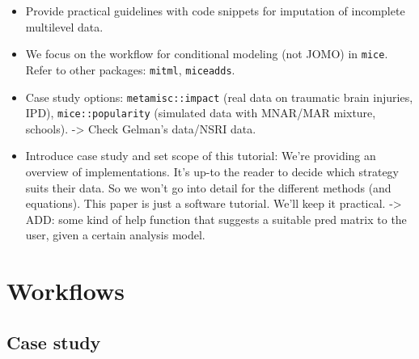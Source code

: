 \documentclass[
]{jss}
\begin{document}
\begin{itemize}
\item
  Provide practical guidelines with code snippets for imputation of
  incomplete multilevel data.
\item
  We focus on the workflow for conditional modeling (not JOMO) in
  \texttt{mice}. Refer to other packages: \texttt{mitml},
  \texttt{miceadds}.
\item
  Case study options: \texttt{metamisc::impact} (real data on traumatic
  brain injuries, IPD), \texttt{mice::popularity} (simulated data with
  MNAR/MAR mixture, schools). -\textgreater{} Check Gelman's data/NSRI
  data.
\item
  Introduce case study and set scope of this tutorial: We're providing
  an overview of implementations. It's up-to the reader to decide which
  strategy suits their data. So we won't go into detail for the
  different methods (and equations). This paper is just a software
  tutorial. We'll keep it practical. -\textgreater{} ADD: some kind of
  help function that suggests a suitable pred matrix to the user, given
  a certain analysis model.
\end{itemize}

\hypertarget{workflows}{%
\section{Workflows}\label{workflows}}

\hypertarget{case-study}{%
\subsection{Case study}\label{case-study}}
\end{document}
